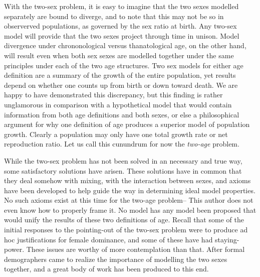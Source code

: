 With the two-sex problem, it is easy to imagine that the two sexes modelled
separately are bound to diverge, and to note that this may not be so in
observerved populations, as governed by the sex ratio at birth. Any two-sex
model will provide that the two sexes project through time in unison. Model
divergence under chrononological versus thanatological age, on the other hand,
will result even when both sex sexes are modelled together under the same principles under each
of the two age structures. Two sex models for either age definition are a
summary of the growth of the entire population, yet results depend on whether
one counts up from birth or down toward death. We are happy to have demonstrated
this discrepancy, but this finding is rather unglamorous in comparison with a
hypothetical model that would contain information from both age definitions and
both sexes, or else a philosophical argument for why one definition of age
produces a superior model of population growth. Clearly a population may only
have one total growth rate or net reproduction ratio. Let us call this cunundrum 
for now the \textit{two-age} problem.

While the two-sex problem has not been solved in an necessary and true way, some
satisfactory solutions have arisen. These solutions have in common that they
deal somehow with mixing, with the interaction between sexes, and axioms have
been developed to help guide the way in determining ideal model properties. No
such axioms exist at this time for the two-age problem-- This author does not
even know how to properly frame it. No model has any model been proposed
that would unify the results of these two definitions of age. Recall that some 
of the initial responses to the pointing-out of the two-sex problem
were to produce ad hoc justifications for female dominance, and some of these
have had staying-power. These issues are worthy of more contemplation than that.
After \citet{karmel1947relations} formal demographers came to realize the
importance of modelling the two sexes together, and a great body 
of work has been produced to this end. 

